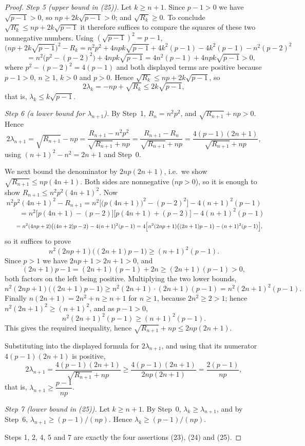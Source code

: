 \begin{proof}
\emph{Step 5 (upper bound in (25)).}  Let $k\ge n+1$.  Since $p-1>0$ we have
$\sqrt{p-1}>0$, so $np+2k\sqrt{p-1}>0$; and $\sqrt{R_k}\ge0$.  To conclude
$\sqrt{R_k}\le np+2k\sqrt{p-1}$ it therefore suffices to compare the squares
of these two nonnegative numbers.  Using $(\sqrt{p-1})^2=p-1$,
\[
  \bigl(np+2k\sqrt{p-1}\bigr)^2-R_k
  =n^2p^2+4npk\sqrt{p-1}+4k^2(p-1)-4k^2(p-1)-n^2(p-2)^2
\]
\[
  \qquad=n^2\bigl(p^2-(p-2)^2\bigr)+4npk\sqrt{p-1}
  =4n^2(p-1)+4npk\sqrt{p-1}>0,
\]
where $p^2-(p-2)^2=4(p-1)$ and both displayed terms are positive because
$p-1>0$, $n\ge1$, $k>0$ and $p>0$.  Hence
$\sqrt{R_k}\le np+2k\sqrt{p-1}$, so
\[
  2\lambda_k=-np+\sqrt{R_k}\le 2k\sqrt{p-1},
\]
that is, $\lambda_k\le k\sqrt{p-1}$.

\emph{Step 6 (a lower bound for $\lambda_{n+1}$).}  By Step~1, $R_n=n^2p^2$,
and $\sqrt{R_{n+1}}+np>0$.  Hence
\[
  2\lambda_{n+1}=\sqrt{R_{n+1}}-np
  =\frac{R_{n+1}-n^2p^2}{\sqrt{R_{n+1}}+np}
  =\frac{R_{n+1}-R_n}{\sqrt{R_{n+1}}+np}
  =\frac{4(p-1)(2n+1)}{\sqrt{R_{n+1}}+np},
\]
using $(n+1)^2-n^2=2n+1$ and Step~0.

We next bound the denominator by $2np(2n+1)$, i.e.\ we show
$\sqrt{R_{n+1}}\le np(4n+1)$.  Both sides are nonnegative ($np>0$), so it is
enough to show $R_{n+1}\le n^2p^2(4n+1)^2$.  Now
\[
  n^2p^2(4n+1)^2-R_{n+1}
  =n^2\bigl[\bigl(p(4n+1)\bigr)^2-(p-2)^2\bigr]-4(n+1)^2(p-1)
\]
\[
  \qquad=n^2\bigl[p(4n+1)-(p-2)\bigr]\bigl[p(4n+1)+(p-2)\bigr]-4(n+1)^2(p-1)
\]
\[
  \qquad=n^2(4np+2)\bigl((4n+2)p-2\bigr)-4(n+1)^2(p-1)
  =4\Bigl[n^2(2np+1)\bigl((2n+1)p-1\bigr)-(n+1)^2(p-1)\Bigr],
\]
so it suffices to prove
\begin{equation*}
  n^2(2np+1)\bigl((2n+1)p-1\bigr)\ge(n+1)^2(p-1).
\end{equation*}
Since $p>1$ we have $2np+1>2n+1>0$, and
\[
  (2n+1)p-1=(2n+1)(p-1)+2n\ge(2n+1)(p-1)>0 ,
\]
both factors on the left being positive.  Multiplying the two lower bounds,
\[
  n^2(2np+1)\bigl((2n+1)p-1\bigr)\ge n^2(2n+1)\cdot(2n+1)(p-1)
  =n^2(2n+1)^2(p-1).
\]
Finally $n(2n+1)=2n^2+n\ge n+1$ for $n\ge1$, because $2n^2\ge2>1$; hence
$n^2(2n+1)^2\ge(n+1)^2$, and as $p-1>0$,
\[
  n^2(2n+1)^2(p-1)\ge(n+1)^2(p-1).
\]
This gives the required inequality, hence $\sqrt{R_{n+1}}+np\le 2np(2n+1)$.

Substituting into the displayed formula for $2\lambda_{n+1}$, and using that
its numerator $4(p-1)(2n+1)$ is positive,
\[
  2\lambda_{n+1}=\frac{4(p-1)(2n+1)}{\sqrt{R_{n+1}}+np}
  \ge\frac{4(p-1)(2n+1)}{2np(2n+1)}=\frac{2(p-1)}{np},
\]
that is, $\lambda_{n+1}\ge\dfrac{p-1}{np}$.

\emph{Step 7 (lower bound in (25)).}  Let $k\ge n+1$.  By Step~0,
$\lambda_k\ge\lambda_{n+1}$, and by Step~6,
$\lambda_{n+1}\ge(p-1)/(np)$.  Hence $\lambda_k\ge(p-1)/(np)$.

Steps 1, 2, 4, 5 and 7 are exactly the four assertions (23), (24) and (25).
\end{proof}
